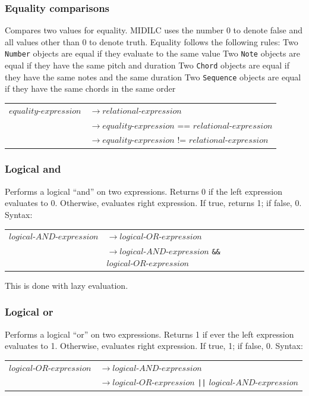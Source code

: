 \documentclass[12pt,A4]{book}
\begin{document}
\subsubsection{Equality comparisons}
Compares two values for equality. MIDILC uses the number 0 to denote false and all values other than 0 to denote truth. Equality follows the following rules:
Two \verb|Number| objects are equal if they evaluate to the same value
Two \verb|Note| objects are equal if they have the same pitch and duration
Two \verb|Chord| objects are equal if they have the same notes and the same duration
Two \verb|Sequence| objects are equal if they have the same chords in the same order

\begin{tabular}{l l}
$equality\mbox{-}expression$  & $\rightarrow relational\mbox{-}expression$\\
& $\rightarrow equality\mbox{-}expression$ == $relational\mbox{-}expression$\\
& $\rightarrow equality\mbox{-}expression$ != $relational\mbox{-}expression$\\
\end{tabular}

\subsubsection{Logical and}
Performs a logical ``and'' on two expressions. Returns 0 if the left expression evaluates to 0. Otherwise, evaluates right expression. If true, returns 1; if false, 0.
Syntax:

\begin{tabular}{l l}
$logical\mbox{-}AND\mbox{-}expression$  & $\rightarrow logical\mbox{-}OR\mbox{-}expression$\\
& $\rightarrow logical\mbox{-}AND\mbox{-}expression$ \verb|&&| $logical\mbox{-}OR\mbox{-}expression$
\end{tabular}

This is done with lazy evaluation.
\subsubsection{Logical or}
Performs a logical ``or'' on two expressions. Returns 1 if ever the left expression evaluates to 1. Otherwise, evaluates right expression. If true, 1; if false, 0.
Syntax:

\begin{tabular}{l l}
$logical\mbox{-}OR\mbox{-}expression$  & $\rightarrow logical\mbox{-}AND\mbox{-}expression$\\
& $\rightarrow logical\mbox{-}OR\mbox{-}expression $ \verb.||. $ logical\mbox{-}AND\mbox{-}expression$
\end{tabular}
\end{document}
